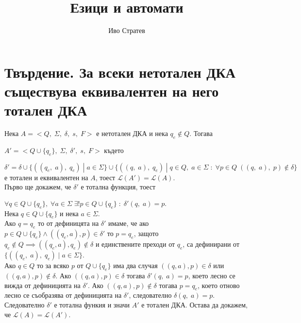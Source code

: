 \documentclass[a4paper, 12pt, oneside]{article}
\title{Езици и автомати}
\author{Иво Стратев}
\newcommand{\Lang}{\mathcal{L}}
\begin{document}
\maketitle

\tableofcontents

\section{Твърдение. За всеки нетотален ДКА съществува еквивалентен на него тотален ДКА}

Нека $A = <Q, \; \Sigma, \; \delta, \; s, \; F>$ е нетотален ДКА и нека $q_e \notin Q$. Тогава

$A' = <Q \cup \{q_e\}, \; \Sigma, \; \delta' , \; s, \; F>$ където

$\delta' = \delta \cup \{((q_e, \; a), \; q_e) \; | \; a \in \Sigma\} \cup \{((q, \; a), \; q_e) \; | \; q \in Q, \; a \in \Sigma \; : \; \forall p \in Q \; ((q, \; a), \; p) \notin \delta\}$
е тотален и еквивалентен на $A$, тоест $\Lang(A') = \Lang(A)$. \\

Първо ще докажем, че $\delta'$ е тотална функция, тоест

$\forall q \in Q \cup \{q_e\}, \; \forall a \in \Sigma \; \exists! p \in Q \cup \{q_e\} \; : \; \delta'(q, \; a) = p$. \\

Нека $q \in Q \cup \{q_e\}$ и нека $a \in \Sigma$.\\

Ако $q = q_e$ то от дефиницята на $\delta'$ имаме,
че ако $p \in Q \cup \{q_e\} \land ((q_e, a), p) \in \delta'$ то
$p = q_e$, защото $q_e \notin Q \implies ((q_e, a), q_e) \notin \delta$
и единствените преходи от $q_e$, са дефинирани от $\{((q_e, \; a), \; q_e) \; | \; a \in \Sigma\}$. \\

Ако $q \in Q$ то за всяко $p$ от $Q \cup \{q_e\}$ има два случая $((q, a), p) \in \delta$ или $((q, a), p) \notin \delta$.
Ако $((q, a), p) \in \delta$ тогава $\delta'(q, \; a) = p$, което лесно се вижда от дефиницията на $\delta'$.
Ако $((q, a), p) \notin \delta$ тогава $p = q_e$, което отново лесно се съобразява от дефиницията на $\delta'$, следователно $\delta(q, \; a) = p$.
Следователно $\delta'$ е тотална функия и значи $A'$ е тотален ДКА. Остава да докажем, че $\Lang(A) = \Lang(A')$. \\
\end{document}
